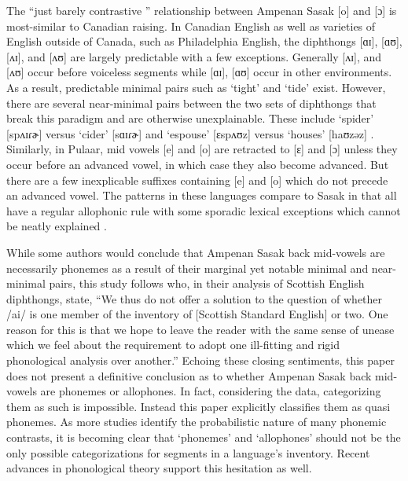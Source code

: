 \documentclass[12pt]{ouparticle}
\begin{document}
The ``just barely contrastive '' relationship between Ampenan Sasak [o] and [ɔ] is most-similar to Canadian raising. In Canadian English as well as varieties of English outside of Canada, such as Philadelphia English, the diphthongs [ɑɪ], [ɑʊ],[ʌɪ], and [ʌʊ] are largely predictable with a few exceptions. Generally [ʌɪ], and [ʌʊ] occur before voiceless segments while [ɑɪ], [ɑʊ] occur in other environments. As a result, predictable minimal pairs such as `tight' and `tide' exist. However, there are several near-minimal pairs between the two sets of diphthongs that break this paradigm and are otherwise unexplainable. These include `spider' [spʌɪɾɚ] versus `cider' [sɑɪɾɚ] and `espouse' [ɛspʌʊz] versus `houses' [haʊzəz] \citep{myers1993}. Similarly, in Pulaar, mid vowels [e] and [o] are retracted to [ɛ] and [ɔ] unless they occur before an advanced vowel, in which case they also become advanced. But there are a few inexplicable suffixes containing [e] and [o] which do not precede an advanced vowel. The patterns in these languages compare to Sasak in that all have a regular allophonic rule with some sporadic lexical exceptions which cannot be neatly explained \citep[e.g][]{paradis1986}. 

While some authors would conclude that Ampenan Sasak back mid-vowels are necessarily phonemes as a result of their marginal yet notable minimal and near-minimal pairs, this study follows \citet[15]{scobbie2008} who, in their analysis of Scottish English diphthongs, state, ``We thus do not offer a solution to the question of whether /ai/ is one member of the inventory of [Scottish Standard English] or two. One reason for this is that we hope to leave the reader with the same sense of unease which we feel about the requirement to adopt one ill-fitting and rigid phonological analysis over another.” Echoing these closing sentiments, this paper does not present a definitive conclusion as to whether Ampenan Sasak back mid-vowels are phonemes or allophones. In fact, considering the data, categorizing them as such is impossible. Instead this paper explicitly classifies them as quasi phonemes. As more studies identify the probabilistic nature of many phonemic contrasts, it is becoming clear that `phonemes' and `allophones' should not be the only possible categorizations for segments in a language's inventory. Recent advances in phonological theory support this hesitation as well. 
\end{document}
